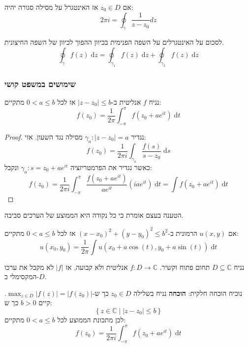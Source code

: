 \documentclass{tstextbook}
\begin{document}
\begin{proposition}
אם \(z_{0} \in D\) אז האינטגרל על מסילה סגורה יהיה:
$$2\pi i = \oint_{\gamma} \frac{1}{z-z_{0}}dz$$

\end{proposition}
\begin{theorem}
לסכום על האינטגרלים על השפה הפנימית בכיוון ההפוך לכיוון של השפה החיצונית.
$$\oint_{\gamma} f(z) \;\mathrm{d}z = \oint_{\gamma_{1}} f(z)\;\mathrm{d}z+\oint_{\gamma_{2}} f(z)\;\mathrm{d}z$$

\end{theorem}
\subsubsection{שימושים במשפט קושי}

\begin{proposition}
נניח \(f\) אנליטית ב-\(\lvert z-z_{0} \rvert\leq b\) אז לכל \(0<a\leq b\) מתקיים:
$$f(z_{0})=\frac{1}{2\pi}\int_{-\pi}^{\pi} f(z_{0}+ae^{ it })\;\mathrm{d}t$$

\end{proposition}
\begin{proof}
נגדיר \(\gamma_{a}:|z-z_{0}|=a\) מסילה נגד השעון. אזי:
$$f(z_{0})=\frac{1}{2\pi i}\int_{\gamma_{a}} \frac{f(s)}{s-z_{0}} \;\mathrm{d}s $$
כאשר נגדיר את הפרמטריזציה \(\gamma_{a}:s=z_{0}+ae^{ it }\) ונקבל:
$$f(z_{0})=\frac{1}{2\pi i} \int_{-\pi}^{\pi} \frac{f(z_{0}+ae^{ it })}{ae^{ it }}(iae^{ it })\;\mathrm{d}t=\int f(z_{0}+ae^{ it }) \;\mathrm{d} t $$

\end{proof}
הטענה בעצם אומרת כי כל נקודה היא הממוצע של הערכים סביבה.

\begin{corollary}
אם \(u(x,y)\) הרמונית ב-\((x-x_{0})^{2}+(y-y_{0})^{2}\leq b^{2}\) אז לכל \(0<a\leq b\) מתקיים:
$$u(x_{0},y_{0})=\frac{1}{2\pi}\int u\left( x_{0}+a\cos(t),y_{0}+a\sin(t) \right) \;\mathrm{d} t $$

\end{corollary}
\begin{proposition}
נניח \(D\subseteq \mathbb{C}\) תחום פתוח וקשיר. \(f:D\to \mathbb{C}\) אנליטית ולא קבועה, אז \(\lvert f \rvert\) לא מקבל את ערכו המקסימלי ב-\(D\).

\end{proposition}
נוכיח הוכחה חלקית:
\textbf{הוכחה}
נניח בשלילה \(z_{0} \in D\) כך ש-\(\max_{z \in D}\lvert f(z) \rvert=\lvert f(z_{0}) \rvert\). קיים \(b>0\) כך ש:
$$\left\{  z \in \mathbb{C} \mid |z-z_{0}|\leq b  \right\}$$
לכן מתכונת הממוצע לכל \(0<a\leq b\) מתקיים:
$$f(z_{0})=\frac{1}{2\pi i} \int_{-\pi}^{\pi}f(z_{0}+ae^{ it })\;\mathrm{d}t$$
\end{document}
